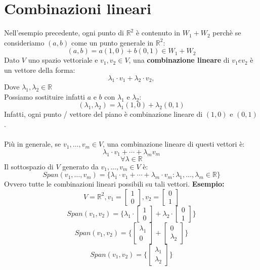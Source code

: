 \documentclass[12pt,a4paper]{article}
\let\oldsection\section
\renewcommand{\section}{\clearpage\oldsection}
\begin{document}
\section{Combinazioni lineari}
Nell'esempio precedente, ogni punto di $\mathbb{R}^2$ è contenuto in $W_1 + W_2$ perchè se consideriamo $(a,b)$ come un punto generale in $\mathbb{R}^2$:
\[
(a,b) = a(1,0) + b(0,1) \in W_1 + W_2
\]
Dato $V$ uno spazio vettoriale e $v_1,v_2 \in V$, una \textbf{combinazione lineare} di $v_1 e v_2$ è un vettore della forma:
\[
\lambda_1 \cdot v_1 + \lambda_2 \cdot v_2,
\]
Dove $\lambda_1, \lambda_2 \in \mathbb{R}$\\
Possiamo sostituire infatti $a$ e $b$ con $\lambda_1$ e $\lambda_2$:
\[
(\lambda_1,\lambda_2) = \lambda_1(1,0) + \lambda_2(0,1)
\]
Infatti, ogni punto / vettore del piano è combinazione lineare di $(1,0)$ e $(0,1)$.\\\\
Più in generale, se $v_1,\ldots,v_m \in V$, una combinazione lineare di questi vettori è:
\[
\lambda_1 \cdot v_1 + \cdots + \lambda_m v_m
\]
\[
\forall \lambda \in \mathbb{R}
\]
Il sottospazio di $V$ generato da $v_1,\ldots,v_m \in V$ è:
\[
Span(v_1,\ldots,v_m) = \{\lambda_1 \cdot v_1 + \cdots + \lambda_m \cdot v_m : \lambda_1,\ldots,\lambda_m \in \mathbb{R}\}
\]
Ovvero tutte le combinazioni lineari possibili su tali vettori.
\textbf{Esempio:}
\[
V = \mathbb{R}^2, v_1 = \begin{bmatrix}
  1\\
  0
\end{bmatrix}, v_2 = \begin{bmatrix}
  0\\
  1
\end{bmatrix}
\]
\[
Span(v_1,v_2) = \{\lambda_1 \cdot \begin{bmatrix}
  1\\
  0
\end{bmatrix} + \lambda_2 \cdot \begin{bmatrix}
  0\\
  1
\end{bmatrix}\}
\]
\[
Span(v_1,v_2) = \{\begin{bmatrix}
  \lambda_1\\
  0
\end{bmatrix} + \begin{bmatrix}
  0\\
  \lambda_2
\end{bmatrix}\}
\]
\[
Span(v_1,v_2) = \{\begin{bmatrix}
  \lambda_1\\
  \lambda_2
\end{bmatrix}\}
\]
\end{document}
